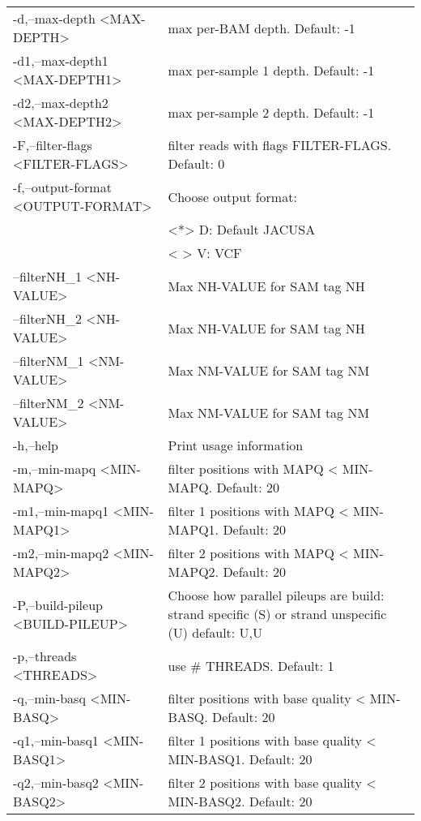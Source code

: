 \documentclass[10pt, a4paper]{article}
\begin{document}
\begin{center}
{\begin{longtable}{p{}p{}}
 -d,--max-depth <MAX-DEPTH>                     & max per-BAM depth. Default: -1 \\
 -d1,--max-depth1 <MAX-DEPTH1>                  & max per-sample 1 depth. Default: -1 \\
 -d2,--max-depth2 <MAX-DEPTH2>                  & max per-sample 2 depth. Default: -1 \\
 -F,--filter-flags <FILTER-FLAGS>               & filter reads with flags FILTER-FLAGS. Default: 0 \\
 -f,--output-format <OUTPUT-FORMAT>             & Choose output format: \\
                                                & <*> D: Default JACUSA \\
                                                & < > V: VCF \\
    --filterNH\_1 <NH-VALUE>                    & Max NH-VALUE for SAM tag NH \\
    --filterNH\_2 <NH-VALUE>                    & Max NH-VALUE for SAM tag NH \\
    --filterNM\_1 <NM-VALUE>                    & Max NM-VALUE for SAM tag NM \\
    --filterNM\_2 <NM-VALUE>                    & Max NM-VALUE for SAM tag NM \\
 -h,--help                                      & Print usage information \\
 -m,--min-mapq <MIN-MAPQ>                       & filter positions with MAPQ < MIN-MAPQ. Default: 20 \\
 -m1,--min-mapq1 <MIN-MAPQ1>                    & filter 1 positions with MAPQ < MIN-MAPQ1. Default: 20 \\
 -m2,--min-mapq2 <MIN-MAPQ2>                    & filter 2 positions with MAPQ < MIN-MAPQ2. Default: 20 \\
 -P,--build-pileup <BUILD-PILEUP>               & Choose how parallel pileups are build: strand specific (S) or strand unspecific (U) default: U,U \\
 -p,--threads <THREADS>                         & use \# THREADS. Default: 1 \\
 -q,--min-basq <MIN-BASQ>                       & filter positions with base quality < MIN-BASQ. Default: 20 \\
 -q1,--min-basq1 <MIN-BASQ1>                    & filter 1 positions with base quality < MIN-BASQ1. Default: 20 \\
 -q2,--min-basq2 <MIN-BASQ2>                    & filter 2 positions with base quality < MIN-BASQ2. Default: 20 \\

\end{longtable}}
\end{center}
\end{document}
